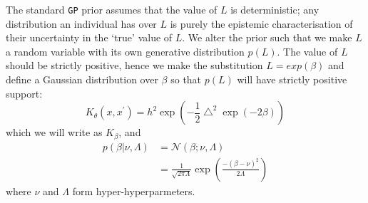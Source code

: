 \documentclass{article}
\begin{document}
The standard \verb"GP" prior assumes that the value of $L$ is deterministic; any distribution an individual has over $L$ is purely the epistemic characterisation of their uncertainty in the `true' value of $L$. We alter the prior such that we make $L$ a random variable with its own generative distribution $p(L)$. The value of $L$ should be strictly positive, hence we make the substitution $L=exp(\beta)$ and define a Gaussian distribution over $\beta$ so that $p(L)$ will have strictly positive support: 
\begin{equation}\label{betaSEkernel}
K_\theta(x,x^\prime) = h^2 \exp \left( -\frac{1}{2}\bigtriangleup^2 \exp(-2\beta) \right)
\end{equation}
which we will write as $K_\beta$, and
\begin{align}
p(\beta|\nu,\Lambda) &= \mathcal{N}(\beta; \nu, \Lambda) \nonumber\\
&= \frac{1}{\sqrt{2 \pi \Lambda}} \exp \left( \frac{ -(\beta - \nu)^2}{2\Lambda} \right) \label{betapdf}
\end{align}
where $\nu$ and $\Lambda$ form hyper-hyperparmeters.
\end{document}
